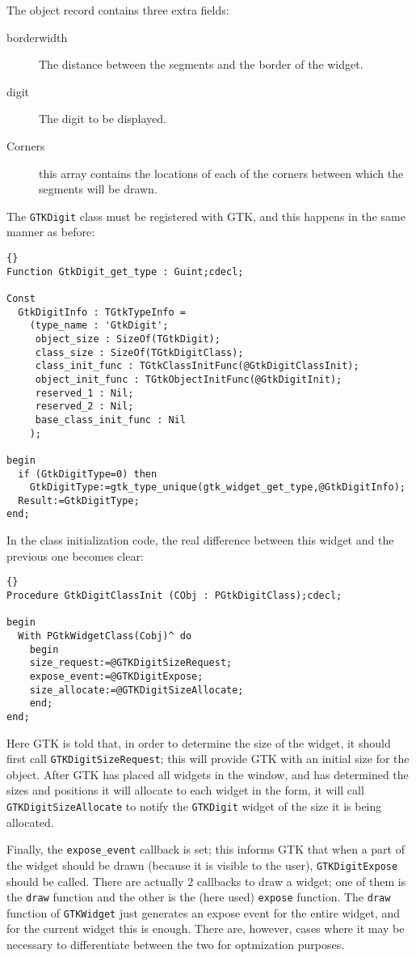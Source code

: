\documentclass[10pt]{article}
\begin{document}
The object record contains three extra fields:
\begin{description}
\item[borderwidth] The distance between the segments and the border of 
the widget.
\item[digit] The digit to be displayed.
\item[Corners] this array contains the locations of each of the corners
between which the segments will be drawn.
\end{description}
The \lstinline|GTKDigit| class must be registered with GTK, and this happens
in the same manner as before:
\begin{lstlisting}{}
Function GtkDigit_get_type : Guint;cdecl;

Const 
  GtkDigitInfo : TGtkTypeInfo = 
    (type_name : 'GtkDigit';
     object_size : SizeOf(TGtkDigit);
     class_size : SizeOf(TGtkDigitClass);
     class_init_func : TGtkClassInitFunc(@GtkDigitClassInit);
     object_init_func : TGtkObjectInitFunc(@GtkDigitInit);
     reserved_1 : Nil;
     reserved_2 : Nil;
     base_class_init_func : Nil
    );

begin
  if (GtkDigitType=0) then
    GtkDigitType:=gtk_type_unique(gtk_widget_get_type,@GtkDigitInfo);
  Result:=GtkDigitType;  
end;
\end{lstlisting}
In the class initialization code, the real difference between this widget
and the previous one becomes clear:
\begin{lstlisting}{}
Procedure GtkDigitClassInit (CObj : PGtkDigitClass);cdecl;

begin
  With PGtkWidgetClass(Cobj)^ do 
    begin
    size_request:=@GTKDigitSizeRequest;
    expose_event:=@GTKDigitExpose;
    size_allocate:=@GTKDigitSizeAllocate;
    end;
end;
\end{lstlisting}
Here GTK is told that, in order to determine the size of the widget,
it should first call \lstinline|GTKDigitSizeRequest|; this will provide
GTK with an initial size for the object. After GTK has placed all widgets
in the window, and has determined the sizes and positions it will allocate 
to each widget in the form, it will call \lstinline|GTKDigitSizeAllocate| 
to notify the \lstinline|GTKDigit| widget of the size it is being allocated.

Finally, the \lstinline|expose_event| callback is set; this informs GTK that
when a part of the widget should be drawn (because it is visible to the
user), \lstinline|GTKDigitExpose| should be called. There are actually 2 
callbacks to draw a widget; one of them is
the \lstinline|draw| function and the other is the (here used) 
\lstinline|expose| function. The \lstinline|draw| function of 
\lstinline|GTKWidget| just generates an expose event for the entire widget,
and for the current widget this is enough. There are, however, cases where
it may be necessary to differentiate between the two for optmization
purposes.
\end{document}
